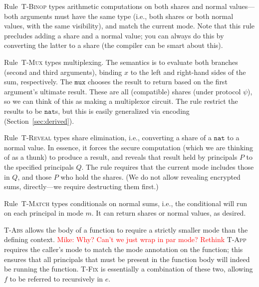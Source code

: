 \documentclass[10pt]{article}
\newcommand{\rulelab}[1]{{\small \textsc{#1}}}
\newcommand{\kw}[1]{\ensuremath{\mathtt{#1}}}
\newcommand{\tnat}{\ensuremath{\mathtt{nat}}}
\newcommand{\elet}[3]{\ensuremath{\kw{let}~#1\, =\, #2~\kw{in}\;{#3}}}
\newcommand{\epar}[2]{\ensuremath{\kw{par}~{#1}~{#2}}}
\newcommand{\mwh}[1]{\textcolor{red}{Mike: #1}}
\begin{document}
Rule~\rulelab{T-Binop} types arithmetic computations on both shares
and normal values---both arguments must have the same type (i.e., both
shares or both normal values, with the same visibility), and match the
current mode. Note that this rule precludes adding a 
share and a normal value; you can always do this by converting the
latter to a share (the compiler can be smart about this).

Rule~\rulelab{T-Mux} types multiplexing. The semantics is to evaluate
both branches (second and third arguments), binding $x$ to the left
and right-hand sides of the sum, respectively. The $\kw{mux}$ chooses
the result to return based on the first argument's ultimate
result. These are all (compatible) shares (under protocol $\psi$), so
we can think of this as making a multiplexor circuit. The rule
restrict the results to be $\tnat$s, but this is easily generalized
via encoding (Section~\ref{sec:derived}).

Rule~\rulelab{T-Reveal} types share elimination, i.e., converting a
share of a $\tnat$ to a normal value. In essence, it forces the secure
computation (which we are thinking of as a thunk) to produce a result,
and reveals that result held by principals $P$ to the specified
principals $Q$. The rule requires that the current mode includes those
in $Q$, and those $P$ who hold the shares. (We do not allow revealing
encrypted sums, directly---we require destructing them first.)

Rule~\rulelab{T-Match} types conditionals on normal sums, i.e., the
conditional will run on each principal in mode $m$. It can return
shares or normal values, as desired. 


\rulelab{T-Abs} allows the body of a function to require a strictly
smaller mode than the defining context. \mwh{Why? Can't we just wrap
  in par mode? Rethink} \rulelab{T-App} requires the caller's mode to
match the mode annotation on the function; this ensures that all
principals that must be present in the function body will indeed be
running the function. \rulelab{T-Fix} is essentially a combination of
these two, allowing $f$ to be referred to recursively in $e$.
\end{document}
